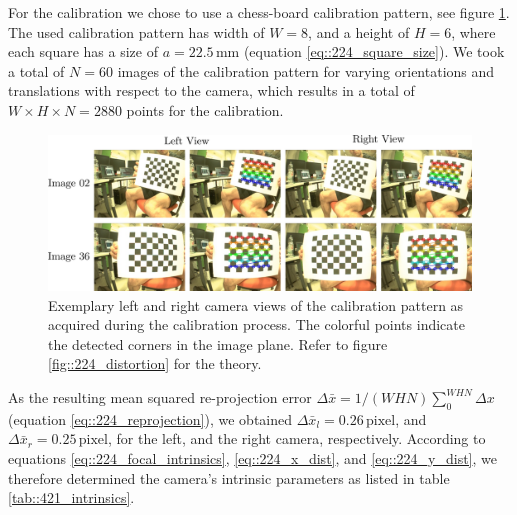 For the calibration we chose to use a chess-board calibration pattern, see figure \ref{fig::421_calib}. The used calibration pattern has width of $W=8$, and a height of $H=6$, where each square has a size of $a=22.5\,\text{mm}$ (equation \ref{eq::224_square_size}). We took a total of $N=60$ images of the calibration pattern for varying orientations and translations with respect to the camera, which results in a total of $W\times H\times N = 2880$ points for the calibration. 
\begin{figure}[h!]
	\centering
	\includegraphics[scale=.28]{chapters/04_experiments/02_autonomous_walking/01_camera_calibration/calib.png}
	\caption{Exemplary left and right camera views of the calibration pattern as acquired during the calibration process. The colorful points indicate the detected corners in the image plane. Refer to figure \ref{fig::224_distortion} for the theory.}
	\label{fig::421_calib}
\end{figure}
As the resulting mean squared re-projection error $\Delta \bar{x} = 1/(WHN)\sum_0^{WHN} \Delta x$ (equation \ref{eq::224_reprojection}), we obtained $\Delta \bar{x}_l = 0.26\, \text{pixel}$, and $\Delta \bar{x}_r = 0.25\,\text{pixel}$, for the left, and the right camera, respectively. According to equations \ref{eq::224_focal_intrinsics}, \ref{eq::224_x_dist}, and \ref{eq::224_y_dist}, we therefore determined the camera's intrinsic parameters as listed in table \ref{tab::421_intrinsics}.
